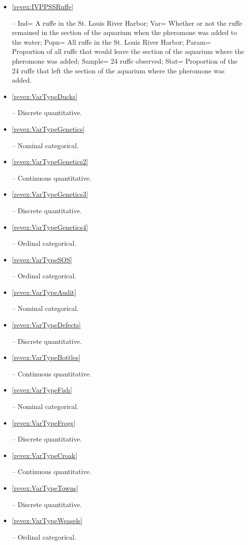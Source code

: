 \documentclass[10pt,openany]{book}\usepackage[]{graphicx}\usepackage[]{color}
\begin{document}
\begin{itemize}
  \item \hypertarget{ans:IVPPSSRuffe}{\ref{revex:IVPPSSRuffe}} -- Ind= A ruffe in the St. Louis River Harbor; Var= Whether or not the ruffe remained in the section of the aquarium when the pheromone was added to the water; Popn= All ruffe in the St. Louis River Harbor; Param= Proportion of all ruffe that would leave the section of the aquarium where the pheromone was added; Sample= 24 ruffe observed; Stat= Proportion of the 24 ruffe that left the section of the aquarium where the pheromone was added.

  \item \hypertarget{ans:VarTypeDucks}{\ref{revex:VarTypeDucks}} -- Discrete quantitative.

  \item \hypertarget{ans:VarTypeGenetics}{\ref{revex:VarTypeGenetics}} -- Nominal categorical.

  \item \hypertarget{ans:VarTypeGenetics2}{\ref{revex:VarTypeGenetics2}} -- Continuous quantitative.

  \item \hypertarget{ans:VarTypeGenetics3}{\ref{revex:VarTypeGenetics3}} -- Discrete quantitative.

  \item \hypertarget{ans:VarTypeGenetics4}{\ref{revex:VarTypeGenetics4}} -- Ordinal categorical.

  \item \hypertarget{ans:VarTypeSOS}{\ref{revex:VarTypeSOS}} -- Ordinal categorical.

  \item \hypertarget{ans:VarTypeAudit}{\ref{revex:VarTypeAudit}} -- Nominal categorical.

  \item \hypertarget{ans:VarTypeDefects}{\ref{revex:VarTypeDefects}} -- Discrete quantitative.

  \item \hypertarget{ans:VarTypeBottles}{\ref{revex:VarTypeBottles}} -- Continuous quantitative.

  \item \hypertarget{ans:VarTypeFish}{\ref{revex:VarTypeFish}} -- Nominal categorical.

  \item \hypertarget{ans:VarTypeFrogs}{\ref{revex:VarTypeFrogs}} -- Discrete quantitative.

  \item \hypertarget{ans:VarTypeCroak}{\ref{revex:VarTypeCroak}} -- Continuous quantitative.

  \item \hypertarget{ans:VarTypeTowns}{\ref{revex:VarTypeTowns}} -- Discrete quantitative.

  \item \hypertarget{ans:VarTypeWeasels}{\ref{revex:VarTypeWeasels}} -- Ordinal categorical.
\end{itemize}
\end{document}
